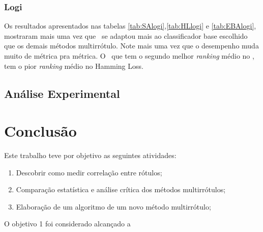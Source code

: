 \subsection{Logi}





Os resultados apresentados nas tabelas \ref{tab:SAlogi},\ref{tab:HLlogi} e \ref{tab:EBAlogi},
mostraram mais uma vez que \ECC~se adaptou mais ao classificador base escolhido 
que os demais métodos multirrótulo.
Note mais uma vez que o desempenho muda muito de métrica pra métrica. O \CC~que tem
o segundo melhor \textit{ranking} médio no \SA, tem o pior \textit{ranking} médio no
Hamming Loss.


% 
% 
% 
% 
% 
% 
% 
% 
% 
% 
% 
% 
% 
% 


\section{Análise Experimental}






\chapter{Conclusão}
Este trabalho teve por objetivo as seguintes atividades:
\begin{enumerate}
 \item Descobrir como medir correlação entre rótulos;
 \item Comparação estatística e análise crítica dos métodos multirrótulos;
 \item Elaboração de um algoritmo de um novo método multirrótulo;
\end{enumerate}
O objetivo 1 foi considerado alcançado a


